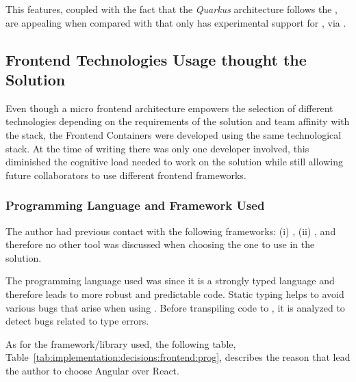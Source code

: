 This features, coupled with the fact that the \textit{Quarkus} architecture follows the , are appealing when compared with  that only has experimental support for , via .

\subsection{Frontend Technologies Usage thought the Solution}
\label{subsec:implementation:decisions:frontend}

Even though a micro frontend architecture empowers the selection of different technologies depending on the requirements of the solution and team affinity with the stack, the Frontend Containers were developed using the same technological stack. At the time of writing there was only one developer involved, this diminished the cognitive load needed to work on the solution while still allowing future collaborators to use different frontend frameworks.

\subsubsection{Programming Language and Framework Used}
\label{subsubsec:implementation:decisions:frontend:prog}

The author had previous contact with the following frameworks: (i) , (ii) , and therefore no other tool was discussed when choosing the one to use in the solution.

The programming language used was  since it is a strongly typed language and therefore leads to more robust and predictable code. Static typing helps to avoid various bugs that arise when using . Before transpiling  code to , it is analyzed to detect bugs related to type errors.

As for the framework/library used, the following table, Table~\ref{tab:implementation:decisions:frontend:prog}, describes the reason that lead the author to choose Angular over React.

